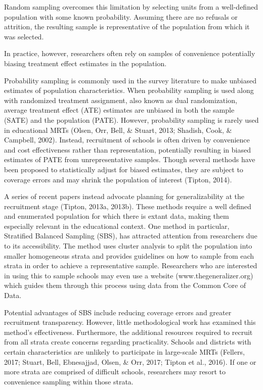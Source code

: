 \documentclass[man,floatsintext]{apa6}
\theoremstyle{definition}
\theoremstyle{definition}
\theoremstyle{definition}
\theoremstyle{remark}
\begin{document}
Random sampling overcomes this limitation by selecting units from a
well-defined population with some known probability. Assuming there are
no refusals or attrition, the resulting sample is representative of the
population from which it was selected.

In practice, however, researchers often rely on samples of convenience
potentially biasing treatment effect estimates in the population.

Probability sampling is commonly used in the survey literature to make
unbiased estimates of population characteristics. When probability
sampling is used along with randomized treatment assignment, also known
as dual randomization, average treatment effect (ATE) estimates are
unbiased in both the sample (SATE) and the population (PATE). However,
probability sampling is rarely used in educational MRTs (Olsen, Orr,
Bell, \& Stuart, 2013; Shadish, Cook, \& Campbell, 2002). Instead,
recruitment of schools is often driven by convenience and cost
effectiveness rather than representation, potentially resulting in
biased estimates of PATE from unrepresentative samples. Though several
methods have been proposed to statistically adjust for biased estimates,
they are subject to coverage errors and may shrink the population of
interest (Tipton, 2014).

A series of recent papers instead advocate planning for generalizability
at the recruitment stage (Tipton, 2013a, 2013b). These methods require a
well defined and enumerated population for which there is extant data,
making them especially relevant in the educational context. One method
in particular, Stratified Balanced Sampling (SBS), has attracted
attention from researchers due to its accessibility. The method uses
cluster analysis to split the population into smaller homogeneous strata
and provides guidelines on how to sample from each strata in order to
achieve a representative sample. Researchers who are interested in using
this to sample schools may even use a website (www.thegeneralizer.org)
which guides them through this process using data from the Common Core
of Data.

Potential advantages of SBS include reducing coverage errors and greater
recruitment transparency. However, little methodological work has
examined this method's effectiveness. Furthermore, the additional
resources required to recruit from all strata create concerns regarding
practicality. Schools and districts with certain characteristics are
unlikely to participate in large-scale MRTs (Fellers, 2017; Stuart,
Bell, Ebnesajjad, Olsen, \& Orr, 2017; Tipton et al., 2016). If one or
more strata are comprised of difficult schools, researchers may resort
to convenience sampling within those strata.
\end{document}
